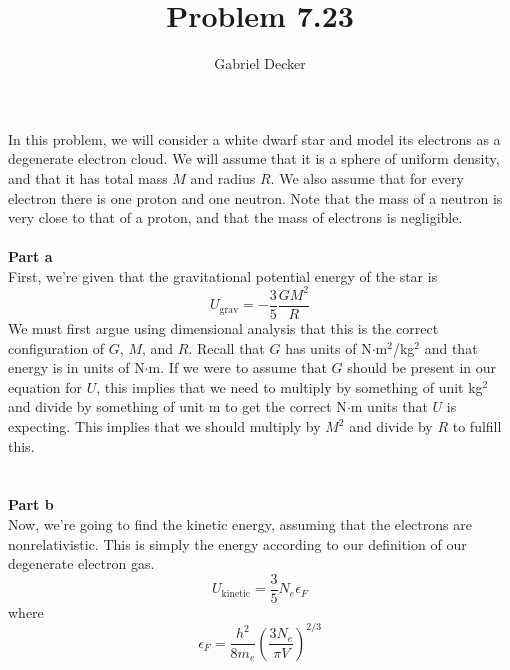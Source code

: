 \documentclass[12pt]{article}
\title{Problem 7.23}
\author{Gabriel Decker}
\begin{document}
\maketitle
\begin{flushleft}



In this problem, we will consider a white dwarf star and model its electrons as a degenerate electron cloud.
We will assume that it is a sphere of uniform density, and that it has total mass $M$ and radius $R$.
We also assume that for every electron there is one proton and one neutron.
Note that the mass of a neutron is very close to that of a proton, and that the mass of electrons is negligible.\\~\\


\textbf{Part a}\\
First, we're given that the gravitational potential energy of the star is
\begin{equation}
    U_\text{grav}=-\frac{3}{5}\frac{GM^2}{R}
\end{equation}
We must first argue using dimensional analysis that this is the correct configuration of $G$, $M$, and $R$.
Recall that $G$ has units of N$\cdot$m$^2$/kg$^2$ and that energy is in units of N$\cdot$m.
If we were to assume that $G$ should be present in our equation for $U$, this implies that we need to multiply by something of unit kg$^2$ and divide by something of unit m to get the correct N$\cdot$m units that $U$ is expecting.
This implies that we should multiply by $M^2$ and divide by $R$ to fulfill this.\\~\\~\\




\textbf{Part b}\\
Now, we're going to find the kinetic energy, assuming that the electrons are nonrelativistic.
This is simply the energy according to our definition of our degenerate electron gas.
\begin{equation}
    U_\text{kinetic}=\frac{3}{5}N_e\epsilon_F
\end{equation}
where
\begin{equation}
    \epsilon_F=\frac{h^2}{8m_e}\left(\frac{3N_e}{\pi V}\right)^{2/3}
\end{equation}\\~\\


\end{flushleft}
\end{document}
